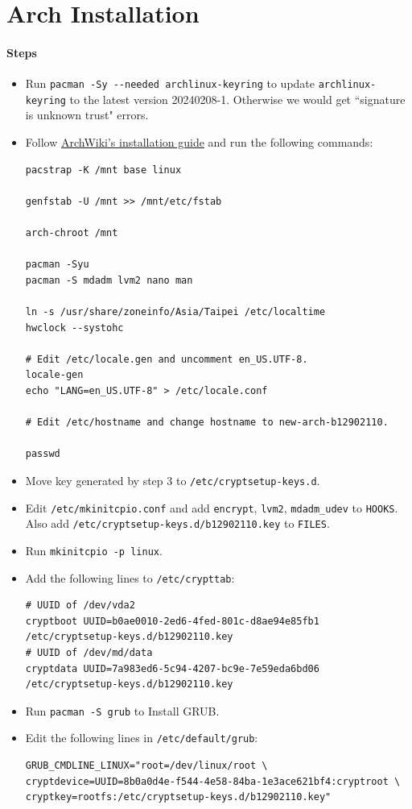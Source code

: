 \documentclass[12pt, a4paper]{article}
\begin{document}
  \section{Arch Installation}
  \paragraph{Steps}
  \begin{itemize}
    \item Run \verb|pacman -Sy --needed archlinux-keyring| to update
    \verb|archlinux-keyring| to the latest version 20240208-1. Otherwise we
    would get ``signature is unknown trust" errors.
    \item Follow \href{https://wiki.archlinux.org/title/installation_guide#Installation}{ArchWiki's installation guide}
    and run the following commands:
    \begin{verbatim}
pacstrap -K /mnt base linux

genfstab -U /mnt >> /mnt/etc/fstab

arch-chroot /mnt

pacman -Syu
pacman -S mdadm lvm2 nano man

ln -s /usr/share/zoneinfo/Asia/Taipei /etc/localtime
hwclock --systohc

# Edit /etc/locale.gen and uncomment en_US.UTF-8.
locale-gen
echo "LANG=en_US.UTF-8" > /etc/locale.conf

# Edit /etc/hostname and change hostname to new-arch-b12902110.

passwd\end{verbatim}
    \item Move key generated by step 3 to \verb|/etc/cryptsetup-keys.d|.
    \item Edit \verb|/etc/mkinitcpio.conf| and add \verb|encrypt|, \verb|lvm2|,
    \verb|mdadm_udev| to \verb|HOOKS|.\\
    Also add \verb|/etc/cryptsetup-keys.d/b12902110.key| to \verb|FILES|.
    \item Run \verb|mkinitcpio -p linux|.
    \item Add the following lines to  \verb|/etc/crypttab|:
    \begin{footnotesize}
      \begin{verbatim}
# UUID of /dev/vda2
cryptboot UUID=b0ae0010-2ed6-4fed-801c-d8ae94e85fb1 /etc/cryptsetup-keys.d/b12902110.key
# UUID of /dev/md/data
cryptdata UUID=7a983ed6-5c94-4207-bc9e-7e59eda6bd06 /etc/cryptsetup-keys.d/b12902110.key\end{verbatim}
  \end{footnotesize}
    \item Run \verb|pacman -S grub| to Install GRUB.
    \item Edit the following lines in \verb|/etc/default/grub|:
    \begin{footnotesize}
      \begin{verbatim}
GRUB_CMDLINE_LINUX="root=/dev/linux/root \
cryptdevice=UUID=8b0a0d4e-f544-4e58-84ba-1e3ace621bf4:cryptroot \
cryptkey=rootfs:/etc/cryptsetup-keys.d/b12902110.key"


\end{verbatim}
\end{footnotesize}
\end{itemize}
\end{document}
